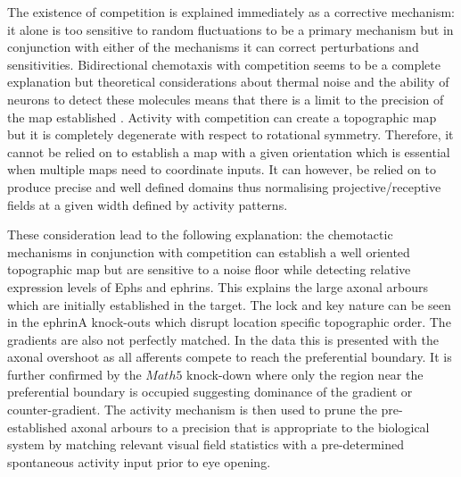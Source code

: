 The existence of competition is explained immediately as a corrective mechanism: it alone is too sensitive to random fluctuations to be a primary mechanism but in conjunction with either of the mechanisms it can correct perturbations and sensitivities. Bidirectional chemotaxis with competition seems to be a complete explanation but theoretical considerations about thermal noise and the ability of neurons to detect these molecules means that there is a limit to the precision of the map established \cite{Goodhill2016-ck}. Activity with competition can create a topographic map but it is completely degenerate with respect to rotational symmetry. Therefore, it cannot be relied on to establish a map with a given orientation which is essential when multiple maps need to coordinate inputs. It can however, be relied on to produce precise and well defined domains thus normalising projective/receptive fields at a given width defined by activity patterns. 

These consideration lead to the following explanation: the chemotactic mechanisms in conjunction with competition can establish a well oriented topographic map but are sensitive to a noise floor while detecting relative expression levels of Ephs and ephrins. This explains the large axonal arbours which are initially established in the target. The lock and key nature can be seen in the ephrinA knock-outs which disrupt location specific topographic order. The gradients are also not perfectly matched. In the data this is presented with the axonal overshoot as all afferents compete to reach the preferential boundary. It is further confirmed by the $Math5$ knock-down where only the region near the preferential boundary is occupied suggesting dominance of the gradient or counter-gradient. The activity mechanism is then used to prune the pre-established axonal arbours to a precision that is appropriate to the biological system by matching relevant visual field statistics with a pre-determined spontaneous activity input prior to eye opening.

